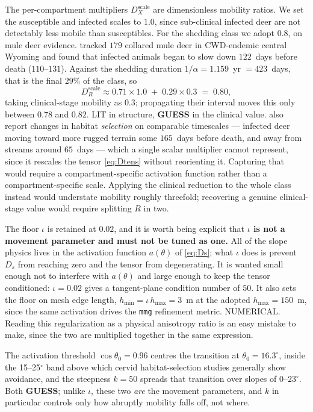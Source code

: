 \documentclass[11pt]{article}
\newcommand{\tagLIT}{{\footnotesize\textsf{\textcolor{green!40!black}{LIT}}}}
\newcommand{\tagGUESS}{{\footnotesize\textsf{\textbf{\textcolor{red!70!black}{GUESS}}}}}
\newcommand{\tagNUM}{{\footnotesize\textsf{\textcolor{purple!70!black}{NUMERICAL}}}}
\begin{document}
The per-compartment multipliers $D_X^{\text{scale}}$ are dimensionless mobility ratios. We set the susceptible and infected scales to $1.0$, since sub-clinical infected deer are not detectably less mobile than susceptibles. For the shedding class we adopt $0.8$, on mule deer evidence. \citet{Barrile2024} tracked $179$ collared mule deer in CWD-endemic central Wyoming and found that infected animals began to slow down $122$~days before death ($110$--$131$). Against the shedding duration $1/\alpha = 1.159$~yr $= 423$~days, that is the final $29\%$ of the class, so
\[
D_R^{\text{scale}} \approx 0.71\times 1.0 \;+\; 0.29\times 0.3 \;=\; 0.80 ,
\]
taking clinical-stage mobility as $0.3$; propagating their interval moves this only between $0.78$ and $0.82$. \tagLIT{} in structure, \tagGUESS{} in the clinical value. \citeauthor{Barrile2024} also report changes in habitat \emph{selection} on comparable timescales --- infected deer moving toward more rugged terrain some $165$~days before death, and away from streams around $65$~days --- which a single scalar multiplier cannot represent, since it rescales the tensor \eqref{eq:Dtens} without reorienting it. Capturing that would require a compartment-specific activation function rather than a compartment-specific scale. Applying the clinical reduction to the whole class instead would understate mobility roughly threefold; recovering a genuine clinical-stage value would require splitting $R$ in two.

The floor $\iota$ is retained at $0.02$, and it is worth being explicit that \textbf{$\iota$ is not a movement parameter and must not be tuned as one.} All of the slope physics lives in the activation function $a(\theta)$ of \eqref{eq:Ds}; what $\iota$ does is prevent $D_s$ from reaching zero and the tensor from degenerating. It is wanted small enough not to interfere with $a(\theta)$ and large enough to keep the tensor conditioned: $\iota = 0.02$ gives a tangent-plane condition number of $50$. It also sets the floor on mesh edge length, $h_{\min} = \iota\,h_{\max} = 3$~m at the adopted $h_{\max} = 150$~m, since the same activation drives the \texttt{mmg} refinement metric. \tagNUM{}. Reading this regularization as a physical anisotropy ratio is an easy mistake to make, since the two are multiplied together in the same expression.

The activation threshold $\cos\theta_0 = 0.96$ centres the transition at $\theta_0 = 16.3^\circ$, inside the 15--25$^\circ$ band above which cervid habitat-selection studies generally show avoidance, and the steepness $k = 50$ spreads that transition over slopes of $0$--$23^\circ$. Both \tagGUESS{}; unlike $\iota$, these two \emph{are} the movement parameters, and $k$ in particular controls only how abruptly mobility falls off, not where.
\end{document}
